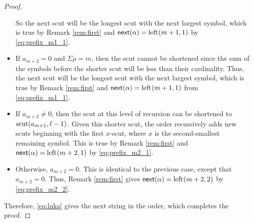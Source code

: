 \begin{proof}
\begin{itemize}[nosep]
    So the next scut will be the longest scut with the next largest symbol, which is true by Remark \ref{rem:first} and $\mathsf{next}{(\alpha)} = \operatorname{left}_{}(m+1,1)$ by \eqref{eq:prefix_m1_1}.
    \item If $a_{m+2} = 0$ and $\Sigma \rho = m$, then the scut cannot be shortened since the sum of the symbols before the shorter scut will be less than their cardinality.
    Thus, the next scut will be the longest scut with the next largest symbol, which is true by Remark \ref{rem:first} and $\mathsf{next}{(\alpha)} = \operatorname{left}_{}(m+1,1)$ from  \eqref{eq:prefix_m1_1}.
    \item If $a_{m+2} \neq 0$, then the scut at this level of recursion can be shortened to $\operatorname{scut}(a_{m+1}, \ell-1)$.
    Given this shorter scut, the order recursively adds new scuts beginning with the first $x$-scut, where $x$ is the second-smallest remaining symbol.
    This is true by Remark \ref{rem:first} and $\mathsf{next}{(\alpha)} = \operatorname{left}_{}(m+2,1)$ by \eqref{eq:prefix_m2_1}.
    \item Otherwise, $a_{m+2} = 0$.
    This is identical to the previous case, except that $a_{m+2} = 0$.
    Thus, Remark \ref{rem:first} gives $\mathsf{next}{(\alpha)} = \operatorname{left}_{}(m+2,2)$ by \eqref{eq:prefix_m2_2}.
\end{itemize}
Therefore, \eqref{eq:luka} gives the next string in the order, which completes the proof.
\end{proof}

